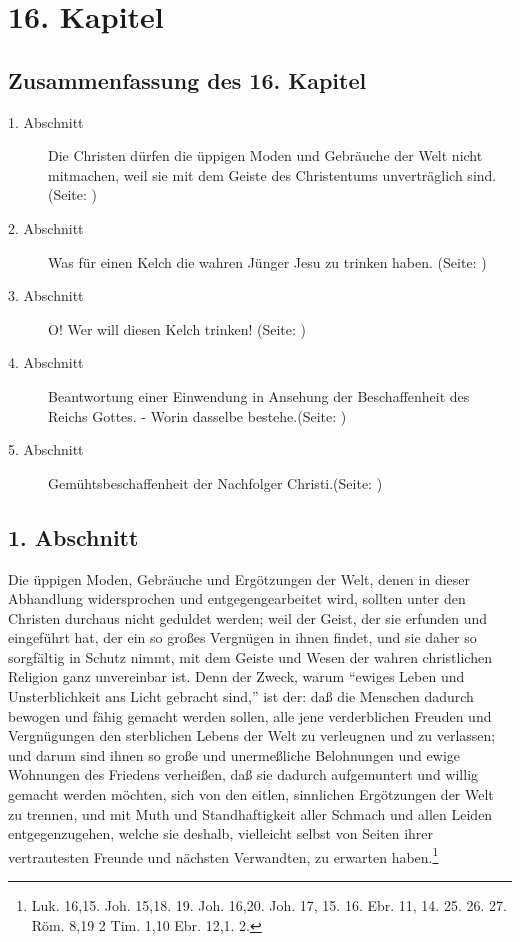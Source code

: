 
\chapter{16. Kapitel} \label{kap16}
\section{Zusammenfassung des 16. Kapitel}
\small
\begin{description}
\item[1. Abschnitt] Die Christen dürfen die üppigen Moden und Gebräuche der Welt
nicht mitmachen, weil sie mit dem Geiste des Christentums unverträglich sind. (Seite: \pageref{kap16_ab1})
\item[2. Abschnitt] Was für einen Kelch die wahren Jünger Jesu zu trinken haben. (Seite: \pageref{kap16_ab2})
\item[3. Abschnitt] O! Wer will diesen Kelch trinken! (Seite: \pageref{kap16_ab3})
\item[4. Abschnitt] Beantwortung einer Einwendung in Ansehung der Beschaffenheit
des Reichs Gottes. - Worin dasselbe bestehe.(Seite: \pageref{kap16_ab4})
\item[5. Abschnitt] Gemühtsbeschaffenheit der Nachfolger Christi.(Seite: \pageref{kap16_ab5})

\end{description}
\normalsize

\section{1. Abschnitt} \label{kap16_ab1}

Die üppigen Moden, Gebräuche und Ergötzungen der Welt, denen in dieser
Abhandlung widersprochen und entgegengearbeitet wird, sollten unter den Christen
durchaus nicht geduldet werden; weil der Geist, der sie erfunden und eingeführt
hat, der ein so großes Vergnügen in ihnen findet, und sie daher so sorgfältig in
Schutz nimmt, mit dem Geiste und Wesen der wahren christlichen Religion ganz
unvereinbar ist. Denn der Zweck, warum "`ewiges Leben und Unsterblichkeit ans
Licht gebracht sind,"' ist der: daß die Menschen dadurch bewogen und fähig
gemacht werden sollen, alle jene verderblichen Freuden und Vergnügungen den
sterblichen Lebens der Welt zu verleugnen und zu verlassen; und darum sind ihnen
so große und unermeßliche Belohnungen und ewige Wohnungen des Friedens
verheißen, daß sie dadurch aufgemuntert und willig gemacht werden möchten, sich
von den eitlen, sinnlichen Ergötzungen der Welt zu trennen, und mit Muth und
Standhaftigkeit aller Schmach und allen Leiden entgegenzugehen, welche sie
deshalb, vielleicht selbst von Seiten ihrer vertrautesten Freunde und nächsten
Verwandten, zu erwarten haben.\footnote{Luk. 16,15. Joh. 15,18. 19. Joh. 16,20.
Joh. 17, 15. 16. Ebr. 11, 14. 25. 26. 27. Röm. 8,19 2 Tim. 1,10 Ebr. 12,1. 2. }

